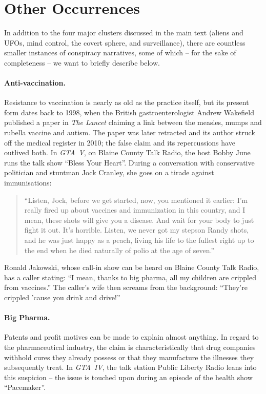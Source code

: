 \documentclass[]{scrartcl}
\begin{document}
\appendix


\section{Other Occurrences}\label{sec:app_other_occurrences}

In addition to the four major clusters discussed in the main text (aliens and UFOs, mind control, the covert sphere, and surveillance), there are countless smaller instances of conspiracy narratives, some of which -- for the sake of completeness -- we want to briefly describe below.

\paragraph{Anti-vaccination.}
Resistance to vaccination is nearly as old as the practice itself, but its present form dates back to 1998, when the British gastroenterologist Andrew Wakefield published a paper in \textit{The Lancet} claiming a link between the measles, mumps and rubella vaccine and autism.
The paper was later retracted and its author struck off the medical register in 2010; the false claim and its repercussions have outlived both.
In \textit{GTA~V}, on Blaine County Talk Radio, the host Bobby June runs the talk show \enquote{Bless Your Heart}.
During a conversation with conservative politician and stuntman Jock Cranley, she goes on a tirade against immunisations:

\begin{quote}
   \enquote{Listen, Jock, before we get started, now, you mentioned it earlier:
   I'm really fired up about vaccines and immunization in this country, and I mean, these shots will give you a disease.
   And wait for your body to just fight it out.
   It's horrible.
   Listen, we never got my stepson Randy shots, and he was just happy as a peach, living his life to the fullest right up to the end when he died naturally of polio at the age of seven.}
\end{quote}

\noindent Ronald Jakowski, whose call-in show can be heard on Blaine County Talk Radio, has a caller stating:
\enquote{I mean, thanks to big pharma, all my children are crippled from vaccines.}
The caller's wife then screams from the background:
\enquote{They're crippled 'cause you drink and drive!}

\paragraph{Big Pharma.}
Patents and profit motives can be made to explain almost anything.
In regard to the pharmaceutical industry, the claim is characteristically that drug companies withhold cures they already possess or that they manufacture the illnesses they subsequently treat.
In \textit{GTA~IV}, the talk station Public Liberty Radio leans into this suspicion -- the issue is touched upon during an episode of the health show \enquote{Pacemaker}.
\end{document}
